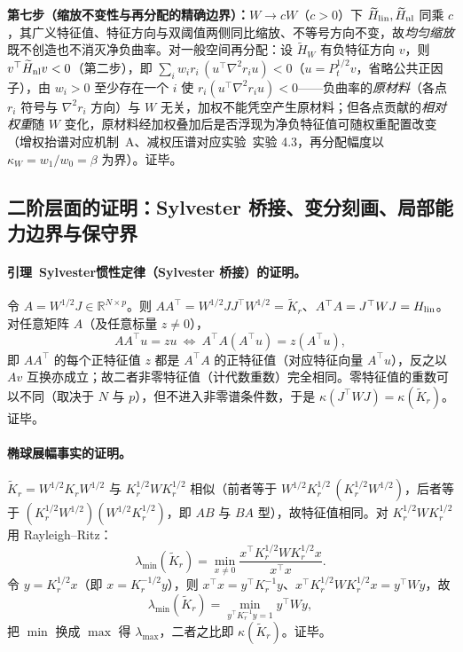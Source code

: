 \documentclass[fontset=windows,11pt]{ctexart}
\newcommand{\R}{\mathbb R}
\newcommand{\W}{W}
\newcommand{\wt}[1]{\widetilde{#1}}
\numberwithin{equation}{section}
\begin{document}
\noindent\textbf{第七步（缩放不变性与再分配的精确边界）：}$\W\to c\W$（$c>0$）下 $\wt H_{\rm lin},\wt H_{\rm nl}$ 同乘 $c$，其广义特征值、特征方向与双阈值两侧同比缩放、不等号方向不变，故\emph{均匀缩放}既不创造也不消灭净负曲率。对一般空间再分配：设 $\wt H_\W$ 有负特征方向 $v$，则 $v^\top\wt H_{\rm nl}v<0$（第二步），即 $\sum_i w_i r_i\,(u^\top\nabla^2r_i u)<0$（$u=P_t^{1/2}v$，省略公共正因子），由 $w_i>0$ 至少存在一个 $i$ 使 $r_i(u^\top\nabla^2r_i u)<0$——负曲率的\emph{原材料}（各点 $r_i$ 符号与 $\nabla^2r_i$ 方向）与 $\W$ 无关，加权不能凭空产生原材料；但各点贡献的\emph{相对权重}随 $\W$ 变化，原材料经加权叠加后是否浮现为净负特征值可随权重配置改变（增权抬谱对应机制~A、减权压谱对应实验~实验 4.3，再分配幅度以 $\kappa_{\W}=w_1/w_0=\beta$ 为界）。证毕。

\subsection{二阶层面的证明：Sylvester 桥接、变分刻画、局部能力边界与保守界}
\paragraph{引理~Sylvester惯性定律（Sylvester 桥接）的证明。}
令 $A=\W^{1/2}J\in\R^{N\times p}$。则 $AA^\top=\W^{1/2}JJ^\top\W^{1/2}=\widetilde K_r$、$A^\top A=J^\top\W J=H_{\rm lin}$。对任意矩阵 $A$（及任意标量 $z\ne0$），
\[
AA^\top u=zu\ \Longleftrightarrow\ A^\top A(A^\top u)=z(A^\top u),
\]
即 $AA^\top$ 的每个正特征值 $z$ 都是 $A^\top A$ 的正特征值（对应特征向量 $A^\top u$），反之以 $Av$ 互换亦成立；故二者非零特征值（计代数重数）完全相同。零特征值的重数可以不同（取决于 $N$ 与 $p$），但不进入非零谱条件数，于是 $\kappa(J^\top\W J)=\kappa(\widetilde K_r)$。证毕。

\paragraph{椭球展幅事实的证明。}
$\widetilde K_r=\W^{1/2}K_r\W^{1/2}$ 与 $K_r^{1/2}\W K_r^{1/2}$ 相似（前者等于 $\W^{1/2}K_r^{1/2}\,(K_r^{1/2}\W^{1/2})$，后者等于 $(K_r^{1/2}\W^{1/2})(\W^{1/2}K_r^{1/2})$，即 $AB$ 与 $BA$ 型），故特征值相同。对 $K_r^{1/2}\W K_r^{1/2}$ 用 Rayleigh--Ritz：
\[
\lambda_{\min}(\widetilde K_r)=\min_{x\ne0}\frac{x^\top K_r^{1/2}\W K_r^{1/2}x}{x^\top x}.
\]
令 $y=K_r^{1/2}x$（即 $x=K_r^{-1/2}y$），则 $x^\top x=y^\top K_r^{-1}y$、$x^\top K_r^{1/2}\W K_r^{1/2}x=y^\top\W y$，故
\[
\lambda_{\min}(\widetilde K_r)=\min_{y^\top K_r^{-1}y=1}y^\top\W y,
\]
把 $\min$ 换成 $\max$ 得 $\lambda_{\max}$，二者之比即 $\kappa(\widetilde K_r)$。证毕。
\end{document}

